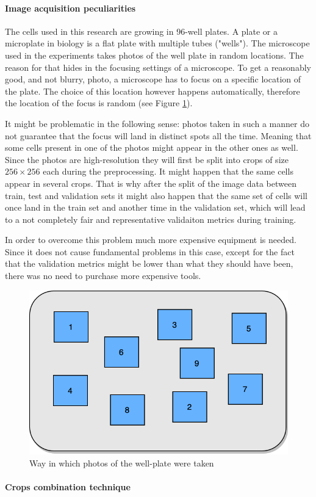 \paragraph{Image acquisition peculiarities} 
    The cells used in this research are growing in 96-well plates. A plate or a microplate in biology is a flat plate with multiple tubes ("wells"). The microscope used in the experiments takes photos of the well plate in random locations. The reason for that hides in the focusing settings of a  microscope.  To get a reasonably good, and not blurry, photo, a microscope has to focus on a specific location of the plate. The choice of this location however happens automatically, therefore the location of the focus is random (see Figure \ref{fig:random-dic}). 
    
    It might be problematic in the following sense: photos taken in such a manner do not guarantee that the focus will land in distinct spots all the time. Meaning that some cells present in one of the photos might appear in the other ones as well. Since the photos are high-resolution they will first be split into crops of size $256 \times 256$ each during the preprocessing. It might happen that the same cells appear in several crops. That is why after the split of the image data between train, test and validation sets it might also happen that the same set of cells will once land in the train set and another time in the validation set, which will lead to a not completely fair and representative validaiton metrics during training.
    
    In order to overcome this problem much more expensive equipment is needed. Since it does not cause fundamental problems in this case, except for the fact that the validation metrics might be lower than what they should have been, there was no need to purchase more expensive tools. 
    
    \begin{figure}[htb]
        \begin{center}
            \includegraphics[width=0.3\linewidth]{bilder/dic-random.png}
            \caption{Way in which photos of the well-plate were taken}\label{fig:random-dic}
        \end{center}
    \end{figure}    
\paragraph{Crops combination technique}\label{par:crops-combination}
    
